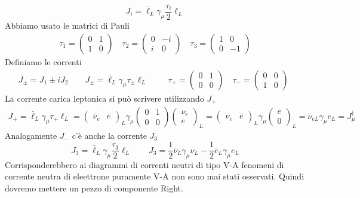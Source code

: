 $$J_i = \bar{\ell}_L \gamma_\mu \frac{\tau_i}{2} \ell_L$$
Abbiamo usato le matrici di Pauli
$$\begin{aligned}
	\tau_1 = \begin{pmatrix} 0 & 1 \\ 1 & 0 \end{pmatrix} \quad \tau_2 = \begin{pmatrix} 0 & -i \\ i & 0 \end{pmatrix} \quad \tau_3 = \begin{pmatrix} 1 & 0 \\ 0 & -1 \end{pmatrix}
\end{aligned}$$
Definiamo le correnti
$$J_\pm = J_1 \pm iJ_2 \qquad J_\pm = \bar{\ell}_L \gamma_\mu \tau_\pm \ell_L \qquad \begin{aligned}
	\tau_+ = \begin{pmatrix} 0 & 1 \\ 0 & 0 \end{pmatrix} \quad \tau_- = \begin{pmatrix} 0 & 0 \\ 1 & 0 \end{pmatrix}
\end{aligned}$$
La corrente carica leptonica si può scrivere utilizzando $J_+$
$$\begin{aligned}
	J_+ = \bar{\ell}_L \gamma_\mu \tau_+ \ell_L = \begin{pmatrix} \bar{\nu}_e & \bar{e} \end{pmatrix}_L \gamma_\mu \begin{pmatrix} 0 & 1 \\ 0 & 0 \end{pmatrix} \begin{pmatrix} \nu_e \\ e \end{pmatrix}_L = \begin{pmatrix} \bar{\nu}_e & \bar{e} \end{pmatrix}_L \gamma_\mu \begin{pmatrix} e \\ 0 \end{pmatrix}_L = \bar{\nu}_{eL} \gamma_\mu e_L = J_\mu^\dagger
\end{aligned}$$
Analogamente $J_-$ c'è anche la corrente $J_3$
$$J_3 = \bar{\ell}_L \gamma_\mu \frac{\tau_3}{2} \ell_L\qquad J_3 = \frac{1}{2} \bar{\nu}_L \gamma_\mu \nu_L - \frac{1}{2} \bar{e}_L \gamma_\mu e_L$$
Corrisponderebbero ai diagrammi di correnti neutri di tipo V-A fenomeni di corrente neutra di eleettrone puramente V-A non sono mai stati osservati. Quindi dovremo mettere un pezzo di componente Right.

